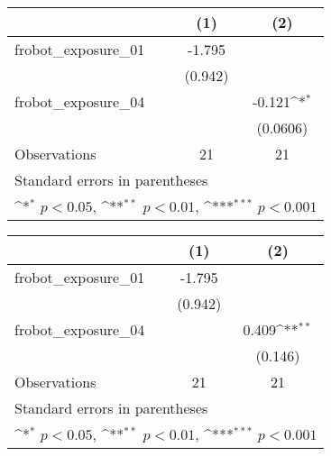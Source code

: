 {
\def\sym#1{\ifmmode^{#1}\else\(^{#1}\)\fi}
\begin{tabular}{l*{2}{c}}
\toprule
                    &\multicolumn{1}{c}{(1)}         &\multicolumn{1}{c}{(2)}         \\
\midrule
frobot\_exposure\_01  &      -1.795         &                     \\
                    &     (0.942)         &                     \\
\addlinespace
frobot\_exposure\_04  &                     &      -0.121\sym{*}  \\
                    &                     &    (0.0606)         \\
\midrule
Observations        &          21         &          21         \\
\bottomrule
\multicolumn{3}{l}{\footnotesize Standard errors in parentheses}\\
\multicolumn{3}{l}{\footnotesize \sym{*} \(p<0.05\), \sym{**} \(p<0.01\), \sym{***} \(p<0.001\)}\\
\end{tabular}
}
{
\def\sym#1{\ifmmode^{#1}\else\(^{#1}\)\fi}
\begin{tabular}{l*{2}{c}}
\toprule
                    &\multicolumn{1}{c}{(1)}         &\multicolumn{1}{c}{(2)}         \\
\midrule
frobot\_exposure\_01  &      -1.795         &                     \\
                    &     (0.942)         &                     \\
\addlinespace
frobot\_exposure\_04  &                     &       0.409\sym{**} \\
                    &                     &     (0.146)         \\
\midrule
Observations        &          21         &          21         \\
\bottomrule
\multicolumn{3}{l}{\footnotesize Standard errors in parentheses}\\
\multicolumn{3}{l}{\footnotesize \sym{*} \(p<0.05\), \sym{**} \(p<0.01\), \sym{***} \(p<0.001\)}\\
\end{tabular}
}
